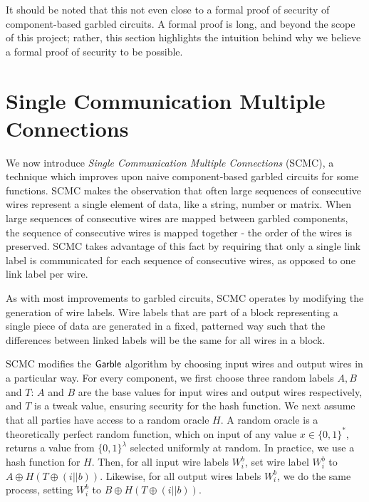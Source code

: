 It should be noted that this not even close to a formal proof of security of component-based garbled circuits. 
A formal proof is long, and beyond the scope of this project; rather, this section highlights the intuition behind why we believe a formal proof of security to be possible. 

\section{Single Communication Multiple Connections}

We now introduce \textit{Single Communication Multiple Connections} (SCMC), a technique which improves upon naive component-based garbled circuits for some functions. 
SCMC makes the observation that often large sequences of consecutive wires represent a single element of data, like a string, number or matrix. 
When large sequences of consecutive wires are mapped between garbled components, the sequence of consecutive wires is mapped together - the order of the wires is preserved. 
SCMC takes advantage of this fact by requiring that only a single link label is communicated for each sequence of consecutive wires, as opposed to one link label per wire. 


As with most improvements to garbled circuits, SCMC operates by modifying the generation of wire labels. 
Wire labels that are part of a block representing a single piece of data are generated in a fixed, patterned way such that the differences between linked labels will be the same for all wires in a block. 

SCMC modifies the $\sf{Garble}$ algorithm by choosing input wires and output wires in a particular way. 
For every component, we first choose three random labels $A,B$ and $T$: $A$ and $B$ are the base values for input wires and output wires respectively, and $T$ is a tweak value, ensuring security for the hash function.
We next assume that all parties have access to a random oracle $H$. 
A random oracle is a theoretically perfect random function, which on input of any value $x \in \{0,1\}^*$, returns a value from $\{0,1\}^{\lambda}$ selected uniformly at random.
In practice, we use a hash function for $H$. 
Then, for all input wire labels $W_i^b$, set wire label $W_i^b$ to $A \oplus H(T \oplus (i || b))$. 
Likewise, for all output wires labels $W_i^b$, we do the same process, setting $W_i^b$ to $B \oplus H(T \oplus (i || b))$.

